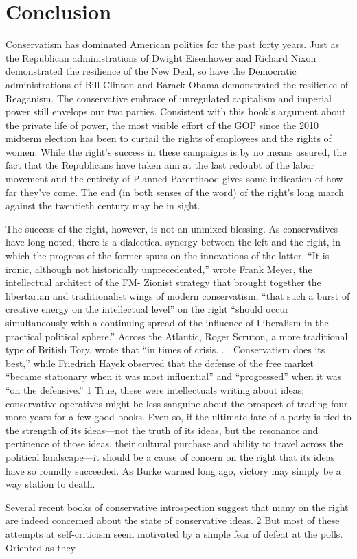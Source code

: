 {\chapter{Conclusion} } {\label{Conclusion} }{\par}{\textit{	} } {\par}{\par} {\textbf{\textit{	} } } {\par} 
	Conservatism has dominated American politics for the past forty years. Just as the Republican administrations of Dwight Eisenhower and Richard Nixon demonstrated the resilience of the New Deal, so have the Democratic administrations of Bill Clinton and Barack Obama demonstrated the resilience of Reaganism. The conservative embrace of unregulated capitalism and imperial power still envelops our two parties. Consistent with this book’s argument about the private life of power, the most visible effort of the GOP since the 2010 midterm election has been to curtail the rights of employees and the rights of women. While the right’s success in these campaigns is by no means assured, the fact that the Republicans have taken aim at the last redoubt of the labor movement and the entirety of Planned Parenthood gives some indication of how far they’ve come. The end (in both senses of the word) of the right’s long march against the twentieth century may be in sight.{\par} 	The success of the right, however, is not an unmixed blessing. As conservatives have long noted, there is a dialectical synergy between the left and the right, in which the progress of the former spurs on the innovations of the latter. “It is ironic, although not historically unprecedented,” wrote Frank Meyer, the intellectual architect of the FM- Zionist strategy that brought together the libertarian and traditionalist wings of modern conservatism, “that such a burst of creative energy on the intellectual level” on the right “should occur simultaneously with a continuing spread of the influence of Liberalism in the practical political sphere.” Across the Atlantic, Roger Scruton, a more traditional type of British Tory, wrote that “in times of crisis. . . Conservatism does its best,” while Friedrich Hayek observed that the defense of the free market “became stationary when it was most influential” and “progressed” when it was “on the defensive.” {\color{blue} 1 } True, these were intellectuals writing about ideas; conservative operatives might be less sanguine about the prospect of trading four more years for a few good books. Even so, if the ultimate fate of a party is tied to the strength of its ideas—not the truth of its ideas, but the resonance and pertinence of those ideas, their cultural purchase and ability to travel across the political landscape—it should be a cause of concern on the right that its ideas have so roundly succeeded. As Burke warned long ago, victory may simply be a way station to death.{\par} Several recent books of conservative introspection suggest that many on the right are indeed concerned about the state of conservative ideas. {\color{blue} 2 } But most of these attempts at self-criticism seem motivated by a simple fear of defeat at the polls. Oriented as they 